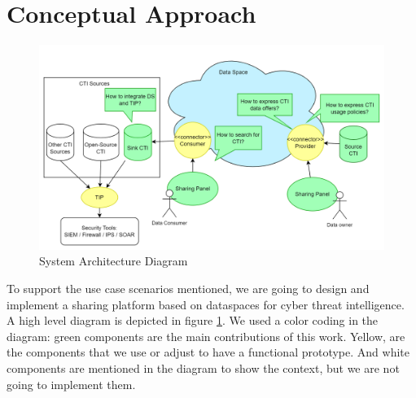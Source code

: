\documentclass{article}
\begin{document}






\section{Conceptual Approach} %
\label{sec:conceptual-approach}


\begin{figure}[ht]
    \centering
    \includegraphics[width=\textwidth]{conceptual_approach.png}
    \caption{System Architecture Diagram}
    \label{fig:system-architecture}
\end{figure}

To support the use case scenarios mentioned, we are going to design and implement a sharing platform based on dataspaces for cyber threat intelligence. A high level diagram is depicted in figure \ref*{fig:system-architecture}. We used a color coding in the diagram: green components are the main contributions of this work. Yellow, are the components that we use or adjust to have a functional prototype. And white components are mentioned in the diagram to show the context, but we are not going to implement them.
\end{document}
